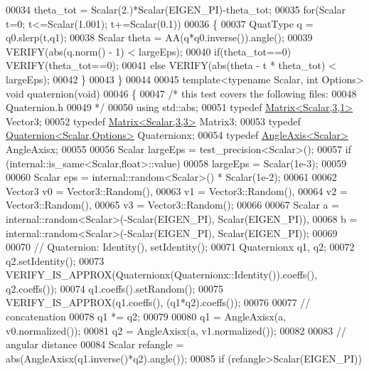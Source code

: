 \begin{DoxyCode}
00034     theta\_tot = Scalar(2.)*Scalar(EIGEN\_PI)-theta\_tot;
00035   \textcolor{keywordflow}{for}(Scalar t=0; t<=Scalar(1.001); t+=Scalar(0.1))
00036   \{
00037     QuatType q = q0.slerp(t,q1);
00038     Scalar theta = AA(q*q0.inverse()).angle();
00039     VERIFY(abs(q.norm() - 1) < largeEps);
00040     \textcolor{keywordflow}{if}(theta\_tot==0)  VERIFY(theta\_tot==0);
00041     \textcolor{keywordflow}{else}              VERIFY(abs(theta - t * theta\_tot) < largeEps);
00042   \}
00043 \}
00044 
00045 \textcolor{keyword}{template}<\textcolor{keyword}{typename} Scalar, \textcolor{keywordtype}{int} Options> \textcolor{keywordtype}{void} quaternion(\textcolor{keywordtype}{void})
00046 \{
00047   \textcolor{comment}{/* this test covers the following files:}
00048 \textcolor{comment}{     Quaternion.h}
00049 \textcolor{comment}{  */}
00050   \textcolor{keyword}{using} std::abs;
00051   \textcolor{keyword}{typedef} \hyperlink{group___core___module}{Matrix<Scalar,3,1>} Vector3;
00052   \textcolor{keyword}{typedef} \hyperlink{group___core___module_class_eigen_1_1_matrix}{Matrix<Scalar,3,3>} Matrix3;
00053   \textcolor{keyword}{typedef} \hyperlink{group___geometry___module_class_eigen_1_1_quaternion}{Quaternion<Scalar,Options>} Quaternionx;
00054   \textcolor{keyword}{typedef} \hyperlink{group___geometry___module_class_eigen_1_1_angle_axis}{AngleAxis<Scalar>} AngleAxisx;
00055 
00056   Scalar largeEps = test\_precision<Scalar>();
00057   \textcolor{keywordflow}{if} (internal::is\_same<Scalar,float>::value)
00058     largeEps = Scalar(1e-3);
00059 
00060   Scalar eps = internal::random<Scalar>() * Scalar(1e-2);
00061 
00062   Vector3 v0 = Vector3::Random(),
00063           v1 = Vector3::Random(),
00064           v2 = Vector3::Random(),
00065           v3 = Vector3::Random();
00066 
00067   Scalar  a = internal::random<Scalar>(-Scalar(EIGEN\_PI), Scalar(EIGEN\_PI)),
00068           b = internal::random<Scalar>(-Scalar(EIGEN\_PI), Scalar(EIGEN\_PI));
00069 
00070   \textcolor{comment}{// Quaternion: Identity(), setIdentity();}
00071   Quaternionx q1, q2;
00072   q2.setIdentity();
00073   VERIFY\_IS\_APPROX(Quaternionx(Quaternionx::Identity()).coeffs(), q2.coeffs());
00074   q1.coeffs().setRandom();
00075   VERIFY\_IS\_APPROX(q1.coeffs(), (q1*q2).coeffs());
00076 
00077   \textcolor{comment}{// concatenation}
00078   q1 *= q2;
00079 
00080   q1 = AngleAxisx(a, v0.normalized());
00081   q2 = AngleAxisx(a, v1.normalized());
00082 
00083   \textcolor{comment}{// angular distance}
00084   Scalar refangle = abs(AngleAxisx(q1.inverse()*q2).angle());
00085   \textcolor{keywordflow}{if} (refangle>Scalar(EIGEN\_PI))

\end{DoxyCode}
